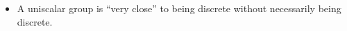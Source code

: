 \documentclass[preview]{standalone}
\begin{document}
\begin{center}
\begin{itemize} \item A uniscalar group is ``very close'' to being discrete without necessarily being discrete.\end{itemize}
\end{center}
\end{document}
